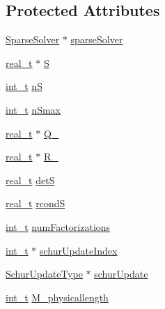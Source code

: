 \subsection*{Protected Attributes}
\begin{DoxyCompactItemize}
\item 
\hyperlink{class_sparse_solver}{Sparse\+Solver} $\ast$ \hyperlink{class_s_q_problem_schur_a55de6d4c9cca036018d0d86fe47e7716}{sparse\+Solver}
\item 
\hyperlink{qp_o_a_s_e_s__wrapper_8h_a0d00e2b3dfadee81331bbb39068570c4}{real\+\_\+t} $\ast$ \hyperlink{class_s_q_problem_schur_aa00427f82e1a308c5b65dc80bdf41287}{S}
\item 
\hyperlink{_types_8hpp_ab6fd6105e64ed14a0c9281326f05e623}{int\+\_\+t} \hyperlink{class_s_q_problem_schur_a8a3424dd9a8ef8cce8f868838d76abda}{nS}
\item 
\hyperlink{_types_8hpp_ab6fd6105e64ed14a0c9281326f05e623}{int\+\_\+t} \hyperlink{class_s_q_problem_schur_ae21ef6e09c14c15a1b3aa9e6b5aa3104}{n\+Smax}
\item 
\hyperlink{qp_o_a_s_e_s__wrapper_8h_a0d00e2b3dfadee81331bbb39068570c4}{real\+\_\+t} $\ast$ \hyperlink{class_s_q_problem_schur_a9cfbb90b9a1b4988720317f1c3bfb82f}{Q\+\_\+}
\item 
\hyperlink{qp_o_a_s_e_s__wrapper_8h_a0d00e2b3dfadee81331bbb39068570c4}{real\+\_\+t} $\ast$ \hyperlink{class_s_q_problem_schur_aec1ca7e22ec0b935840dd7d365ce589f}{R\+\_\+}
\item 
\hyperlink{qp_o_a_s_e_s__wrapper_8h_a0d00e2b3dfadee81331bbb39068570c4}{real\+\_\+t} \hyperlink{class_s_q_problem_schur_aa720518f285aa051c98f5cf80c344928}{detS}
\item 
\hyperlink{qp_o_a_s_e_s__wrapper_8h_a0d00e2b3dfadee81331bbb39068570c4}{real\+\_\+t} \hyperlink{class_s_q_problem_schur_a616981f9388fc8f4f9610fd8b1305015}{rcondS}
\item 
\hyperlink{_types_8hpp_ab6fd6105e64ed14a0c9281326f05e623}{int\+\_\+t} \hyperlink{class_s_q_problem_schur_a5c4cad8c95212332d6eefcef4e39eec8}{num\+Factorizations}
\item 
\hyperlink{_types_8hpp_ab6fd6105e64ed14a0c9281326f05e623}{int\+\_\+t} $\ast$ \hyperlink{class_s_q_problem_schur_a19b9f18a99513793542bc53524951c94}{schur\+Update\+Index}
\item 
\hyperlink{_types_8hpp_ab47fe4250d4805d1f5e357f55c65a4c6}{Schur\+Update\+Type} $\ast$ \hyperlink{class_s_q_problem_schur_aab9ef0db0deec0bc0459a0b075768194}{schur\+Update}
\item 
\hyperlink{_types_8hpp_ab6fd6105e64ed14a0c9281326f05e623}{int\+\_\+t} \hyperlink{class_s_q_problem_schur_afeff2901122ec7a4561f6bd451314e1e}{M\+\_\+physicallength}

\end{DoxyCompactItemize}
